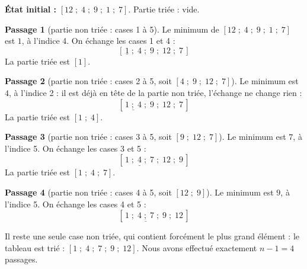 \documentclass[11pt]{article}
\begin{document}
\begin{exemplebox}
\textbf{État initial :} $[12 \;;\; 4 \;;\; 9 \;;\; 1 \;;\; 7]$. Partie triée : vide.

\textbf{Passage 1} (partie non triée : cases 1 à 5). Le minimum de $[12 \;;\; 4 \;;\; 9 \;;\; 1 \;;\; 7]$ est $1$, à l'indice 4. On échange les cases 1 et 4 :
\[ [\,\underline{1} \;;\; 4 \;;\; 9 \;;\; 12 \;;\; 7\,] \]
La partie triée est $[1]$.

\textbf{Passage 2} (partie non triée : cases 2 à 5, soit $[4 \;;\; 9 \;;\; 12 \;;\; 7]$). Le minimum est $4$, à l'indice 2 : il est déjà en tête de la partie non triée, l'échange ne change rien :
\[ [\,\underline{1 \;;\; 4} \;;\; 9 \;;\; 12 \;;\; 7\,] \]
La partie triée est $[1 \;;\; 4]$.

\textbf{Passage 3} (partie non triée : cases 3 à 5, soit $[9 \;;\; 12 \;;\; 7]$). Le minimum est $7$, à l'indice 5. On échange les cases 3 et 5 :
\[ [\,\underline{1 \;;\; 4 \;;\; 7} \;;\; 12 \;;\; 9\,] \]
La partie triée est $[1 \;;\; 4 \;;\; 7]$.

\textbf{Passage 4} (partie non triée : cases 4 à 5, soit $[12 \;;\; 9]$). Le minimum est $9$, à l'indice 5. On échange les cases 4 et 5 :
\[ [\,\underline{1 \;;\; 4 \;;\; 7 \;;\; 9} \;;\; 12\,] \]

Il reste une seule case non triée, qui contient forcément le plus grand élément : le tableau est trié : $[1 \;;\; 4 \;;\; 7 \;;\; 9 \;;\; 12]$. Nous avons effectué exactement $n - 1 = 4$ passages.
\end{exemplebox}
\end{document}
